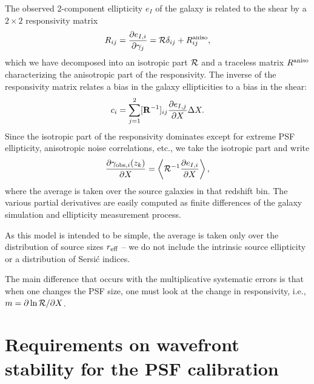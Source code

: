 \documentclass[usenatbib]{mnras}
\begin{document}
The observed 2-component ellipticity $e_I$ of the galaxy is related to
the shear by a $2\times 2$ responsivity matrix
\begin{equation}
R_{ij} = \frac{\partial e_{I,i}}{\partial\gamma_j} = {\cal R}\delta_{ij} + R^{\rm aniso}_{ij},
\end{equation}
which we have decomposed into an isotropic part ${\cal R}$ and a
traceless matrix $R^{\rm aniso}$ characterizing the anisotropic part
of the responsivity. The inverse of the responsivity matrix relates a
bias in the galaxy ellipticities to a bias in the shear:
\begin{equation}
c_i = \sum_{j=1}^2 [{\bf R}^{-1}]_{ij} \frac{\partial e_{I,j}}{\partial X} \Delta X.
\end{equation}
Since the isotropic part of the responsivity dominates except for
extreme PSF ellipticity, anisotropic noise correlations, etc., we take
the isotropic part and write
\begin{equation}
\frac{\partial\gamma_{{\rm obs},i}(z_k)}{\partial X} = \left\langle {\cal R}^{-1} \frac{\partial e_{I,i}}{\partial X} \right\rangle,
\end{equation}
where the average is taken over the source galaxies in that redshift
bin. The various partial derivatives are easily computed as finite
differences of the galaxy simulation and ellipticity measurement
process.

As this model is intended to be simple, the average is taken only over
the distribution of source sizes $r_{\rm eff}$ -- we do not include
the intrinsic source ellipticity or a distribution of Sersi\'c
indices.

The main difference that occurs with the multiplicative systematic errors is that when one changes the PSF size, one must look at the change in responsivity, i.e., $m = \partial \ln {\cal R}/\partial X$.

\section{Requirements on wavefront stability for the PSF calibration}
\label{app:psf-stability}
\end{document}
